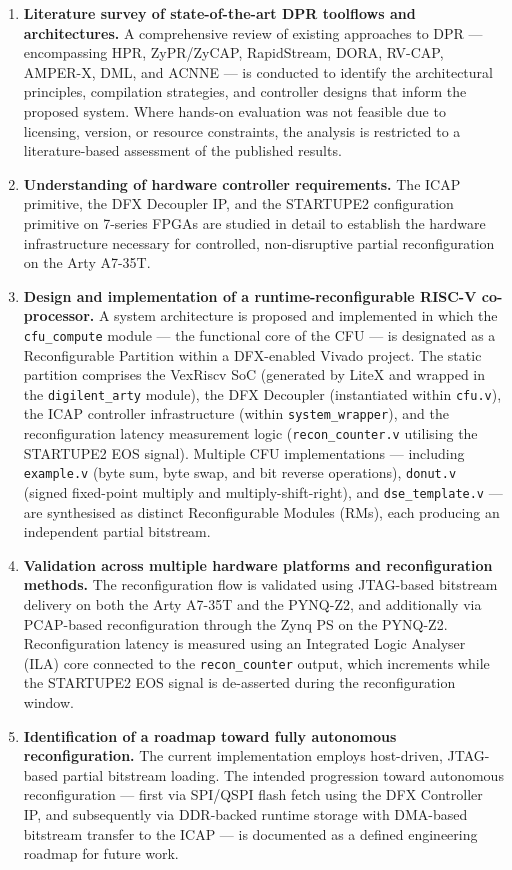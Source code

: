 \begin{enumerate}
  \item \textbf{Literature survey of state-of-the-art DPR toolflows and architectures.} A comprehensive review of existing approaches to DPR — encompassing HPR, ZyPR/ZyCAP, RapidStream, DORA, RV-CAP, AMPER-X, DML, and ACNNE — is conducted to identify the architectural principles, compilation strategies, and controller designs that inform the proposed system. Where hands-on evaluation was not feasible due to licensing, version, or resource constraints, the analysis is restricted to a literature-based assessment of the published results.
  \item \textbf{Understanding of hardware controller requirements.} The ICAP primitive, the DFX Decoupler IP, and the STARTUPE2 configuration primitive on 7-series FPGAs are studied in detail to establish the hardware infrastructure necessary for controlled, non-disruptive partial reconfiguration on the Arty A7-35T.
  \item \textbf{Design and implementation of a runtime-reconfigurable RISC-V co-processor.} A system architecture is proposed and implemented in which the \texttt{cfu\_compute} module — the functional core of the CFU — is designated as a Reconfigurable Partition within a DFX-enabled Vivado project. The static partition comprises the VexRiscv SoC (generated by LiteX and wrapped in the \texttt{digilent\_arty} module), the DFX Decoupler (instantiated within \texttt{cfu.v}), the ICAP controller infrastructure (within \texttt{system\_wrapper}), and the reconfiguration latency measurement logic (\texttt{recon\_counter.v} utilising the STARTUPE2 EOS signal). Multiple CFU implementations — including \texttt{example.v} (byte sum, byte swap, and bit reverse operations), \texttt{donut.v} (signed fixed-point multiply and multiply-shift-right), and \texttt{dse\_template.v} — are synthesised as distinct Reconfigurable Modules (RMs), each producing an independent partial bitstream.
  \item \textbf{Validation across multiple hardware platforms and reconfiguration methods.} The reconfiguration flow is validated using JTAG-based bitstream delivery on both the Arty A7-35T and the PYNQ-Z2, and additionally via PCAP-based reconfiguration through the Zynq PS on the PYNQ-Z2. Reconfiguration latency is measured using an Integrated Logic Analyser (ILA) core connected to the \texttt{recon\_counter} output, which increments while the STARTUPE2 EOS signal is de-asserted during the reconfiguration window.
  \item \textbf{Identification of a roadmap toward fully autonomous reconfiguration.} The current implementation employs host-driven, JTAG-based partial bitstream loading. The intended progression toward autonomous reconfiguration — first via SPI/QSPI flash fetch using the DFX Controller IP, and subsequently via DDR-backed runtime storage with DMA-based bitstream transfer to the ICAP — is documented as a defined engineering roadmap for future work.
\end{enumerate}